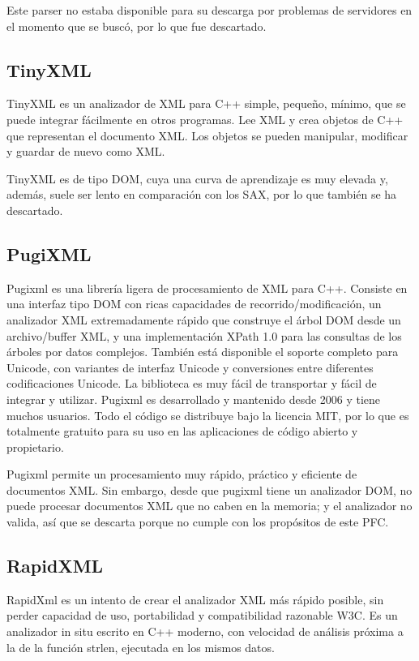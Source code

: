 Este parser no estaba disponible para su descarga por problemas de servidores en
el momento que se buscó, por lo que fue descartado.

\subsection{TinyXML}

TinyXML \cite{Web:TinyXML} es un analizador de XML para C++ simple, pequeño,
mínimo, que se puede integrar fácilmente en otros programas. Lee XML y crea
objetos de C++ que representan el documento XML. Los objetos se pueden
manipular, modificar y guardar de nuevo como XML.

TinyXML es de tipo DOM, cuya una curva de aprendizaje es muy elevada y, además,
suele ser lento en comparación con los SAX, por lo que también se ha descartado.

\subsection{PugiXML}

Pugixml \cite{Web:pugixml} es una librería ligera de procesamiento de XML para
C++. Consiste en una interfaz tipo DOM con ricas capacidades de
recorrido/modificación, un analizador XML extremadamente rápido que construye el
árbol DOM desde un archivo/buffer XML, y una implementación XPath 1.0 para las
consultas de los árboles por datos complejos. También está disponible el soporte
completo para Unicode, con variantes de interfaz Unicode y conversiones entre
diferentes codificaciones Unicode. La biblioteca es muy fácil de transportar y
fácil de integrar y utilizar. Pugixml es desarrollado y mantenido desde 2006 y
tiene muchos usuarios. Todo el código se distribuye bajo la licencia MIT, por lo
que es totalmente gratuito para su uso en las aplicaciones de código abierto y
propietario.

Pugixml permite un procesamiento muy rápido, práctico y eficiente de documentos
XML. Sin embargo, desde que pugixml tiene un analizador DOM, no puede procesar
documentos XML que no caben en la memoria; y el analizador no valida, así que se
descarta porque no cumple con los propósitos de este PFC.

\subsection{RapidXML}

RapidXml \cite{Web:rapidxml} es un intento de crear el analizador XML más rápido
posible, sin perder capacidad de uso, portabilidad y compatibilidad razonable
W3C. Es un analizador in situ escrito en C++ moderno, con velocidad de análisis
próxima a la de la función strlen, ejecutada en los mismos datos.

